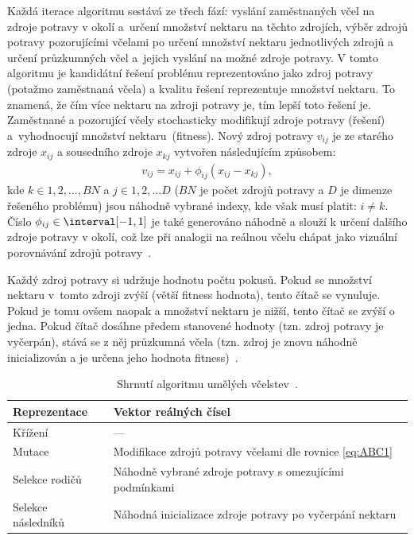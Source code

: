 Každá iterace algoritmu sestává ze třech fází: vyslání zaměstnaných včel na zdroje potravy v okolí a~určení množství nektaru na těchto zdrojích, výběr zdrojů potravy pozorujícími včelami po určení množství nektaru jednotlivých zdrojů a určení průzkumných včel a~jejich vyslání na možné zdroje potravy. V tomto algoritmu je kandidátní řešení problému reprezentováno jako zdroj potravy (potažmo zaměstnaná včela) a kvalitu řešení reprezentuje množství nektaru. To znamená, že čím více nektaru na zdroji potravy je, tím lepší toto řešení je. Zaměstnané a pozorující včely stochasticky modifikují zdroje potravy (řešení) a~vyhodnocují množství nektaru~(fitness). Nový zdroj potravy $v_{ij}$ je ze starého zdroje $x_{ij}$ a sousedního zdroje $x_{kj}$ vytvořen následujícím způsobem:
\begin{align}
    \label{eq:ABC1}
    v_{ij} = x_{ij} + \phi_{ij} (x_{ij} - x_{kj}),
\end{align}
kde $k \in {1, 2, ..., BN}$ a $j \in {1, 2, ... D}$ ($BN$ je počet zdrojů potravy a $D$ je dimenze řešeného problému) jsou náhodně vybrané indexy, kde však musí platit: $i \neq k$. Číslo $\phi_{ij} \in \interval[{-1,1}]$ je také generováno náhodně a slouží k určení dalšího zdroje potravy v okolí, což lze při analogii na reálnou včelu chápat jako vizuální porovnávání zdrojů potravy~\cite{ABC, ABC_TSP}.

Každý zdroj potravy si udržuje hodnotu počtu pokusů. Pokud se množství nektaru v~tomto zdroji zvýší (větší fitness hodnota), tento čítač se vynuluje. Pokud je tomu ovšem naopak a množství nektaru je nižší, tento čítač se zvýší o jedna. Pokud čítač dosáhne předem stanovené hodnoty (tzn. zdroj potravy je vyčerpán), stává se z něj průzkumná včela (tzn. zdroj je znovu náhodně inicializován a je určena jeho hodnota fitness)~\cite{ABC}.



\begin{table}[htp]
\centering
\caption{Shrnutí algoritmu umělých včelstev~\cite{ABC}.}
\label{tab:ABC}
\begin{tabular}{|l|l|}
\hline
Reprezentace & Vektor reálných čísel \\ \hline
Křížení & --- \\ \hline
Mutace & Modifikace zdrojů potravy včelami dle rovnice \ref{eq:ABC1} \\ \hline
Selekce rodičů & Náhodně vybrané zdroje potravy s omezujícími podmínkami \\ \hline
Selekce následníků & Náhodná inicializace zdroje potravy po vyčerpání nektaru \\ \hline
\end{tabular}
\end{table}


